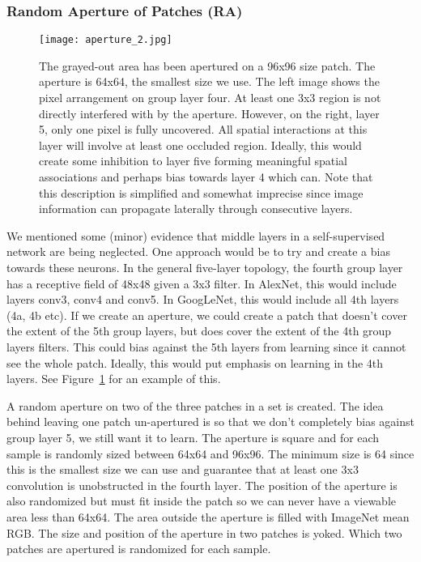 \documentclass[10pt,twocolumn,letterpaper]{article}
\begin{document}
\subsubsection{Random Aperture of Patches (RA)}
\begin{figure}
\centering
\texttt{[image: aperture\_2.jpg]}
\caption{The grayed-out area has been apertured on a 96x96 size patch. The aperture is 64x64, the smallest size we use. The left image shows the pixel arrangement on group layer four. At least one 3x3 region is not directly interfered with by the aperture. However, on the right, layer 5, only one pixel is fully uncovered. All spatial interactions at this layer will involve at least one occluded region. Ideally, this would create some inhibition to layer five forming meaningful spatial associations and perhaps bias towards layer 4 which can. Note that this description is simplified and somewhat imprecise since image information can propagate laterally through consecutive layers.}
\label{fig:aperture}
\end{figure}
We mentioned some (minor) evidence that middle layers in a self-supervised network are being neglected. One approach would be to try and create a bias towards these neurons. In the general five-layer topology, the fourth group layer has a receptive field of 48x48 given a 3x3 filter. In AlexNet, this would include layers conv3, conv4 and conv5. In GoogLeNet, this would include all 4th layers (4a, 4b etc). If we create an aperture, we could create a patch that doesn't cover the extent of the 5th group layers, but does cover the extent of the 4th group layers filters. This could bias against the 5th layers from learning since it cannot see the whole patch. Ideally, this would put emphasis on learning in the 4th layers. See Figure~\ref{fig:aperture} for an example of this.

A random aperture on two of the three patches in a set is created. The idea behind leaving one patch un-apertured is so that we don't completely bias against group layer 5, we still want it to learn. The aperture is square and for each sample is randomly sized between 64x64 and 96x96. The minimum size is 64 since this is the smallest size we can use and guarantee that at least one 3x3 convolution is unobstructed in the fourth layer. The position of the aperture is also randomized but must fit inside the patch so we can never have a viewable area less than 64x64.  The area outside the aperture is filled with ImageNet mean RGB. The size and position of the aperture in two patches is yoked. Which two patches are apertured is randomized for each sample. 
\end{document}

